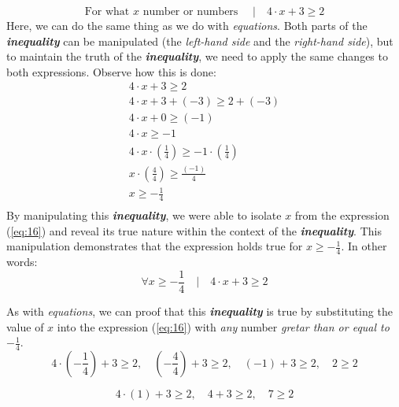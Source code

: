 \begin{equation} \label{eq:16}
  \text{For what $x$ number or numbers }\quad |\quad  4 \cdot x + 3 \geq 2
\end{equation}
Here, we can do the same thing as we do with \textit{equations}. Both parts of the \textit{\textbf{inequality}} can be manipulated (the \textit{left-hand side} and the \textit{right-hand side}), but to maintain the truth of the \textit{\textbf{inequality}}, we need to apply the same changes to both expressions. Observe how this is done:
\[
  \begin{gathered}
    4 \cdot x + 3 \geq 2\\
    4 \cdot x + 3 + (-3) \geq 2 + (-3)\\
    4 \cdot x + 0 \geq (-1)\\
    4 \cdot x \geq -1\\
    4 \cdot x \cdot (\frac{1}{4}) \geq -1 \cdot (\frac{1}{4})\\
    x \cdot (\frac{4}{4}) \geq \frac{(-1)}{4}\\
    x \geq - \frac{1}{4}\\
  \end{gathered}
\]
By manipulating this \textit{\textbf{inequality}}, we were able to isolate $x$ from the expression (\ref{eq:16}) and reveal its true nature within the context of the \textit{\textbf{inequality}}. This manipulation demonstrates that the expression holds true for $x \geq - \frac{1}{4}$. In other words:
\[
  \forall x \geq - \frac{1}{4} \quad | \quad 4 \cdot x + 3 \geq 2
\]

As with \textit{equations}, we can proof that this \textit{\textbf{inequality}} is true by substituting the value of $x$ into the expression (\ref{eq:16}) with \textit{any} number \textit{gretar than or equal to} $- \frac{1}{4}$.
\[
  4 \cdot (- \frac{1}{4}) + 3 \geq 2,\quad (- \frac{4}{4}) + 3 \geq 2, \quad (- 1) + 3 \geq 2,\quad 2 \geq 2
\]

\[
  4 \cdot (1) + 3 \geq 2,\quad 4 + 3 \geq 2, \quad 7 \geq 2
\]

